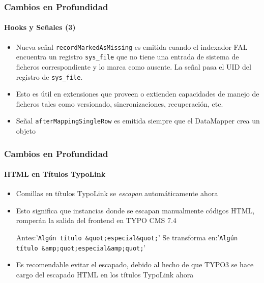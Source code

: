 \begin{frame}[fragile]
	\frametitle{Cambios en Profundidad}
	\framesubtitle{Hooks y Señales (3)}

	\begin{itemize}

		\item Nueva señal \texttt{recordMarkedAsMissing} es emitida cuando el indexador FAL encuentra un
			registro \texttt{sys\_file} que no tiene una entrada de sistema de ficheros correspondiente y lo marca como
			ausente. La señal pasa el UID del registro de \texttt{sys\_file}.

		\item Esto es útil en extensiones que proveen o extienden capacidades de manejo de ficheros tales como
			versionado, sincronizaciones, recuperación, etc.

		\item Señal \texttt{afterMappingSingleRow} es emitida siempre que el DataMapper crea un objeto

	\end{itemize}

\end{frame}


\begin{frame}[fragile]
	\frametitle{Cambios en Profundidad}
	\framesubtitle{HTML en Títulos TypoLink}

	\lstset{basicstyle=\tiny\ttfamily}

	\begin{itemize}

		\item Comillas en títulos TypoLink se \textit{escapan} automáticamente ahora
		\item Esto significa que instancias donde se escapan manualmente códigos HTML,
			romperán la salida del frontend en TYPO CMS 7.4

			Antes:\tabto{1.8cm}'\texttt{Algún título \&quot;especial\&quot;}'\newline
			Se transforma en:\tabto{1.8cm}'\texttt{Algún título \&amp;quot;especial\&amp;quot;}'

		\item Es recomendable evitar el escapado, debido al hecho de que TYPO3 se hace cargo del escapado
			HTML en los títulos TypoLink ahora

	\end{itemize}

	\breakingchange

\end{frame}

